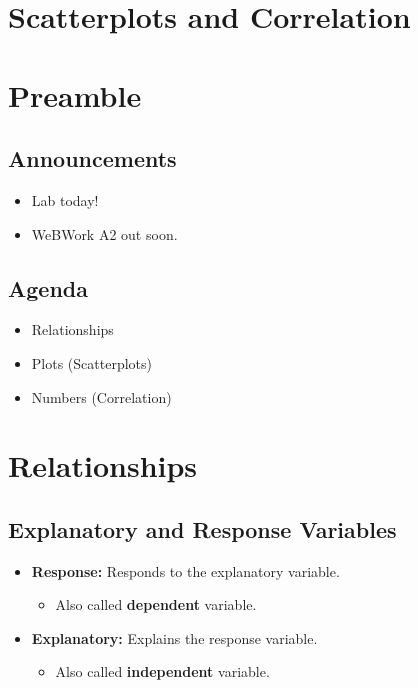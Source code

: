 \documentclass[
  letterpaper,
  DIV=11,
  numbers=noendperiod]{scrreprt}
\providecommand{\tightlist}{%
  \setlength{\itemsep}{0pt}\setlength{\parskip}{0pt}}\usepackage{longtable,booktabs,array}
\begin{document}
\hypertarget{scatterplots-and-correlation}{%
\chapter{Scatterplots and
Correlation}\label{scatterplots-and-correlation}}

\hypertarget{preamble-1}{%
\chapter{Preamble}\label{preamble-1}}

\hypertarget{announcements-2}{%
\section{Announcements}\label{announcements-2}}

\begin{itemize}
\tightlist
\item
  Lab today!\lspace
\item
  WeBWork A2 out soon.\lspace
\end{itemize}

\hypertarget{agenda-2}{%
\section{Agenda}\label{agenda-2}}

\begin{itemize}
\tightlist
\item
  Relationships\lspace
\item
  Plots (Scatterplots)\lspace
\item
  Numbers (Correlation)
\end{itemize}

\hypertarget{relationships}{%
\chapter{Relationships}\label{relationships}}

\hypertarget{explanatory-and-response-variables}{%
\section{Explanatory and Response
Variables}\label{explanatory-and-response-variables}}

\begin{itemize}
\tightlist
\item
  \textbf{Response:} Responds to the explanatory variable.

  \begin{itemize}
  \tightlist
  \item
    Also called \textbf{dependent} variable.\lspace
  \end{itemize}
\item
  \textbf{Explanatory:} Explains the response variable.

  \begin{itemize}
  \tightlist
  \item
    Also called \textbf{independent} variable.
  \end{itemize}
\end{itemize}
\end{document}
